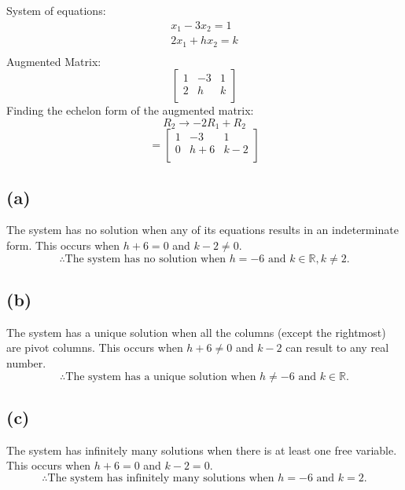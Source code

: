 \documentclass[12pt, a4paper]{article}
\begin{document}
System of equations:
\begin{align*}
    x_1 - 3x_2 = 1 \\
    2x_1 + hx_2 = k \\
\end{align*}
Augmented Matrix:
\[
\begin{bmatrix}
    1 & -3 & 1 \\
    2 & h & k \\
\end{bmatrix}
\]
\linebreak
Finding the echelon form of the augmented matrix:
\[R_2 \rightarrow -2R_1 + R_2\]
\[
= \begin{bmatrix}
    1 & -3 & 1 \\
    0 & h + 6 & k - 2 \\
\end{bmatrix}
\]

\subsection*{(a)}
The system has no solution when any of its equations results in an indeterminate form. This occurs when $h + 6 = 0$ and $k - 2 \neq 0$.
\[
\therefore \text{The system has no solution when } h = -6 \text{ and } k \in \mathbb{R}, k \neq 2.
\]

\subsection*{(b)}
The system has a unique solution when all the columns (except the rightmost) are pivot columns. This occurs when $h+6 \neq 0$ and $k - 2$ can result to any real number.
\[
\therefore \text{The system has a unique solution when } h \neq -6 \text{ and } k \in \mathbb{R}.
\]

\subsection*{(c)}
The system has infinitely many solutions when there is at least one free variable. This occurs when $h + 6 = 0$ and $k - 2 = 0$.
\[
\therefore \text{The system has infinitely many solutions when } h = -6 \text{ and } k = 2.
\]
\end{document}
